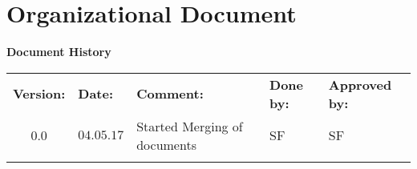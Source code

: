 \cleartoleftpage
{
\Hide
\part{Organizational Document}
}
 \bigskip
\begin{center}
\textbf{\Large Document History}\\
\begin{tabular}{cllll}
\rowcolor{cadetgrey}
\textbf{Version:}    &\textbf{Date:} 	 &\textbf{Comment:}    &\textbf{Done by:}   &\textbf{Approved by:}  \\
0.0       & $04.05.17$       & Started Merging of documents  & SF    & SF          \\\rowcolor{gainsboro}


\end{tabular}                                                                   
\end{center}

\vspace*{3.0 cm}


\newpage

%

\setcounter{section}{0}
\setcounter{secnumdepth}{2}

\startcontents  
\setcounter{tocdepth}{2}
\chapter*{\contentsname}

\vspace*{1cm}

\vspace*{1cm}
\newpage


\newpage



\newpage


\newpage


\newpage


\newpage

%

\stopcontents
{}
